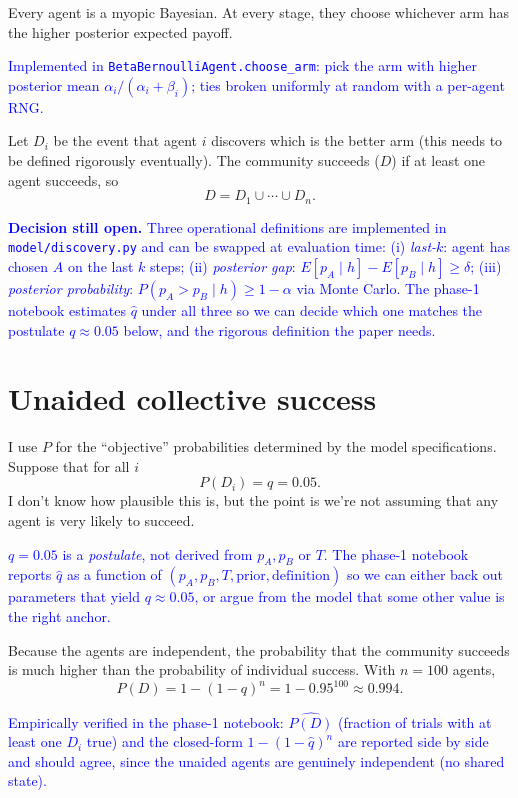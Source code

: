 \documentclass[12pt]{article}
\newcommand{\ignacio}[1]{\textcolor{blue}{#1}}
\begin{document}
Every agent is a myopic Bayesian.
At every stage, they choose whichever arm has the higher posterior expected payoff.

\ignacio{Implemented in \texttt{BetaBernoulliAgent.choose\_arm}: pick the arm with higher posterior mean $\alpha_i / (\alpha_i + \beta_i)$; ties broken uniformly at random with a per-agent RNG.}

Let $D_i$ be the event that agent $i$ discovers which is the better arm (this needs to be defined rigorously eventually).
The community succeeds ($D$) if at least one agent succeeds, so
\[
  D = D_1 \cup \cdots \cup D_n.
\]

\ignacio{\textbf{Decision still open.} Three operational definitions are implemented in \texttt{model/discovery.py} and can be swapped at evaluation time: (i) \emph{last-$k$}: agent has chosen $A$ on the last $k$ steps; (ii) \emph{posterior gap}: $E[p_A \mid h] - E[p_B \mid h] \geq \delta$; (iii) \emph{posterior probability}: $P(p_A > p_B \mid h) \geq 1 - \alpha$ via Monte Carlo. The phase-1 notebook estimates $\hat q$ under all three so we can decide which one matches the postulate $q \approx 0.05$ below, and the rigorous definition the paper needs.}

\section{Unaided collective success}
\label{sec:unaided}

I use $P$ for the ``objective'' probabilities determined by the model specifications.
Suppose that for all $i$
\[
  P(D_i) = q = 0.05.
\]
I don't know how plausible this is, but the point is we're not assuming that any agent is very likely to succeed.

\ignacio{$q = 0.05$ is a \emph{postulate}, not derived from $p_A, p_B$ or $T$. The phase-1 notebook reports $\hat q$ as a function of $(p_A, p_B, T, \text{prior}, \text{definition})$ so we can either back out parameters that yield $q \approx 0.05$, or argue from the model that some other value is the right anchor.}

Because the agents are independent, the probability that the community succeeds is much higher than the probability of individual success.
With $n = 100$ agents,
\[
  P(D) = 1 - (1-q)^n = 1 - 0.95^{100} \approx 0.994.
\]

\ignacio{Empirically verified in the phase-1 notebook: $\widehat{P(D)}$ (fraction of trials with at least one $D_i$ true) and the closed-form $1 - (1-\hat q)^n$ are reported side by side and should agree, since the unaided agents are genuinely independent (no shared state).}
\end{document}
